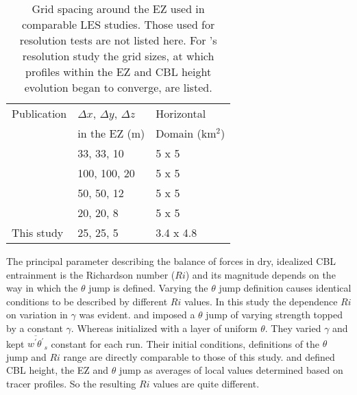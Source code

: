 \begin{table}[htbp]
\caption[Comparison of Grid-Sizes used in similar Studies]{Grid spacing around the EZ used in comparable LES studies. Those used for resolution tests are not listed here.  For \cite{SullPat}'s resolution study the grid sizes, at which profiles within the EZ and CBL height evolution began to converge, are listed.}

    \begin{tabular}{p{4cm} p{2cm} p{2cm}}
Publication & $\Delta x$, $\Delta y$, $\Delta z$ & Horizontal \\
 & in the EZ (m) & Domain (km$^{2}$) \\ \hline
      \cite{SullMoengStev}& 33, 33, 10 & 5 x 5 \\ %
      \cite{FedConzMir04}& 100, 100, 20 & 5 x 5 \\ %
      \cite{BrooksFowler2}& 50, 50, 12 & 5 x 5 \\%
      \cite{SullPat} &  20, 20, 8 & 5 x 5\\ %
      This study & 25, 25, 5 &  3.4 x 4.8\\ \hline       
    \end{tabular}
\label{table:gridcomp}   
\end{table}

The principal parameter describing the balance of forces in dry, idealized CBL entrainment is the Richardson number ($Ri$) and its magnitude depends on the way in which the $\theta$ jump is defined.  Varying the $\theta$ jump definition causes identical conditions to be described by different $Ri$ values.  In this study the dependence $Ri$ on variation in $\gamma$ was evident.  \cite{BrooksFowler2} and \cite{SullMoengStev} imposed a $\theta$ jump of varying strength topped by a constant $\gamma$.  Whereas \cite{FedConzMir04} initialized with a layer of uniform $\theta$.  They varied $\gamma$ and kept $\overline{w^{'}\theta^{'}}_{s}$ constant for each run.  Their initial conditions, definitions of the $\theta$ jump and $Ri$ range are directly comparable to those of this study.  \cite{BrooksFowler2} and \cite{SullMoengStev} defined CBL height, the EZ and $\theta$ jump as averages of local values determined based on tracer profiles.  So the resulting $Ri$ values are quite different.    

